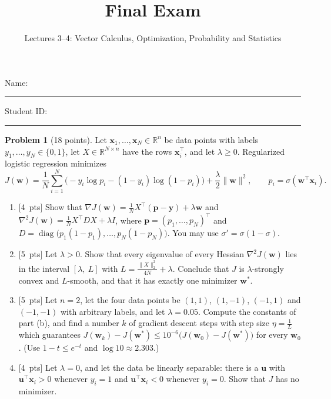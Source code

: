 \documentclass[11pt]{article}
\title{Final Exam}
\author{Lectures 3--4: Vector Calculus, Optimization, Probability and Statistics}
\date{}
\theoremstyle{definition}
\newtheorem{problem}{Problem}
\newcommand{\norm}[1]{\lVert #1 \rVert}
\newcommand{\pts}[1]{\textup{[#1~pts]}}
\DeclareMathOperator{\diag}{diag}
\begin{document}
\maketitle
\thispagestyle{empty}

\noindent Name: \rule{7cm}{0.4pt} \hfill Student ID: \rule{4cm}{0.4pt}

\medskip
\noindent{}

\bigskip

\begin{problem}[18 points]\label{pr:fin-logistic}
    Let $\mathbf{x}_1, \ldots, \mathbf{x}_N \in \mathbb{R}^n$ be data points with labels $y_1, \ldots, y_N \in \{0, 1\}$, let $X \in \mathbb{R}^{N \times n}$ have the rows $\mathbf{x}_i^\top$, and let $\lambda \geq 0$. Regularized logistic regression minimizes
    \[J(\mathbf{w}) = \frac{1}{N}\sum_{i=1}^N \big(-y_i\log p_i - (1 - y_i)\log(1 - p_i)\big) + \frac{\lambda}{2}\norm{\mathbf{w}}^2, \qquad p_i = \sigma(\mathbf{w}^\top\mathbf{x}_i).\]
    \begin{enumerate}[label=(\alph*)]
        \item \pts{4} Show that $\nabla J(\mathbf{w}) = \frac{1}{N}X^\top(\mathbf{p} - \mathbf{y}) + \lambda\mathbf{w}$ and $\nabla^2 J(\mathbf{w}) = \frac{1}{N}X^\top DX + \lambda I$, where $\mathbf{p} = (p_1, \ldots, p_N)^\top$ and $D = \diag\big(p_1(1 - p_1), \ldots, p_N(1 - p_N)\big)$. You may use $\sigma' = \sigma(1 - \sigma)$.
        \item \pts{5} Let $\lambda > 0$. Show that every eigenvalue of every Hessian $\nabla^2 J(\mathbf{w})$ lies in the interval $[\lambda, \ L]$ with $L = \frac{\norm{X}_2^2}{4N} + \lambda$. Conclude that $J$ is $\lambda$-strongly convex and $L$-smooth, and that it has exactly one minimizer $\mathbf{w}^*$.
        \item \pts{5} Let $n = 2$, let the four data points be $(1, 1)$, $(1, -1)$, $(-1, 1)$ and $(-1, -1)$ with arbitrary labels, and let $\lambda = 0.05$. Compute the constants of part (b), and find a number $k$ of gradient descent steps with step size $\eta = \frac{1}{L}$ which guarantees $J(\mathbf{w}_k) - J(\mathbf{w}^*) \leq 10^{-6}\big(J(\mathbf{w}_0) - J(\mathbf{w}^*)\big)$ for every $\mathbf{w}_0$. (Use $1 - t \leq e^{-t}$ and $\log 10 \approx 2.303$.)
        \item \pts{4} Let $\lambda = 0$, and let the data be linearly separable: there is a $\mathbf{u}$ with $\mathbf{u}^\top\mathbf{x}_i > 0$ whenever $y_i = 1$ and $\mathbf{u}^\top\mathbf{x}_i < 0$ whenever $y_i = 0$. Show that $J$ has no minimizer.
    \end{enumerate}
\end{problem}
\end{document}

